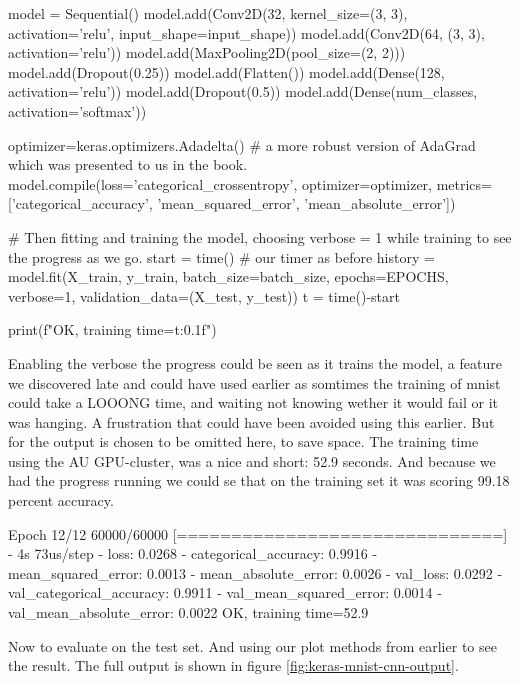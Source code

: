 \documentclass{article}
\begin{document}
\begin{pyminted}
model = Sequential()
model.add(Conv2D(32, kernel_size=(3, 3),
                 activation='relu',
                 input_shape=input_shape))
model.add(Conv2D(64, (3, 3), activation='relu'))
model.add(MaxPooling2D(pool_size=(2, 2)))
model.add(Dropout(0.25))
model.add(Flatten())
model.add(Dense(128, activation='relu'))
model.add(Dropout(0.5))
model.add(Dense(num_classes, activation='softmax'))

optimizer=keras.optimizers.Adadelta() # a more robust version of AdaGrad which was presented to us in the book. 
model.compile(loss='categorical_crossentropy', 
              optimizer=optimizer, 
              metrics=['categorical_accuracy', 'mean_squared_error', 'mean_absolute_error'])


# Then fitting and training the model, choosing verbose = 1 while training to see the progress as we go.
start = time() # our timer as before
history = model.fit(X_train, y_train,
          batch_size=batch_size,
          epochs=EPOCHS,
          verbose=1,
          validation_data=(X_test, y_test))
t = time()-start

print(f"OK, training time={t:0.1f}")
\end{pyminted}

\noindent
Enabling the verbose the progress could be seen as it trains the model, a feature we discovered late and could have used earlier as somtimes the training of mnist could take a LOOONG time, and waiting not knowing wether it would fail or it was hanging.
A frustration that could have been avoided using this earlier. But for the output is chosen to be omitted here, to save space. The training time using the AU GPU-cluster, was a nice and short: 52.9 seconds. And because we had the progress running we could se that on the training set it was scoring 99.18 percent accuracy.

\begin{pyconsole}
Epoch 12/12
60000/60000 [==============================] - 4s 73us/step - loss: 0.0268 - categorical_accuracy: 0.9916 - mean_squared_error: 0.0013 - mean_absolute_error: 0.0026 - val_loss: 0.0292 - val_categorical_accuracy: 0.9911 - val_mean_squared_error: 0.0014 - val_mean_absolute_error: 0.0022
OK, training time=52.9
\end{pyconsole}

\noindent
Now to evaluate on the test set. And using our plot methods from earlier to see the result. The full output is shown in figure \ref{fig:keras-mnist-cnn-output}. 
\end{document}

